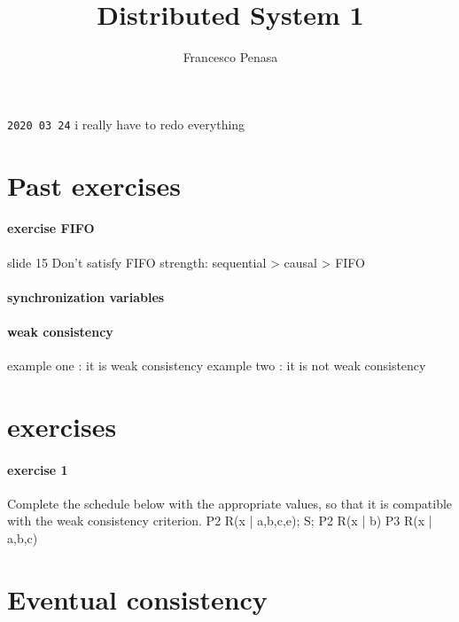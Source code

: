 \documentclass[11pt]{article}
\begin{document}
\author{Francesco Penasa}
\title{Distributed System 1}
\maketitle

\medskip

\texttt{2020 03 24}
i really have to redo everything
\section{Past exercises} %
\label{sec:past_exercises}
\paragraph{exercise FIFO} %
\label{par:exercise_fifo}
slide 15
Don't satisfy FIFO
strength: sequential > causal > FIFO


\paragraph{synchronization variables} %
\label{par:synchronization_variables}


\paragraph{weak consistency} %
\label{par:weak_consistency}
example one : it is weak consistency
example two : it is not weak consistency

\section{exercises} %
\label{sec:exercises}
\paragraph{exercise 1} %
\label{par:exercise_1}
Complete the schedule below with the appropriate values, so that it is compatible with the weak consistency criterion.
P2 R(x | a,b,c,e); S; P2 R(x | b)
P3 R(x | a,b,c)

\section{Eventual consistency} %
\label{sec:eventual_consistency}

\end{document}
